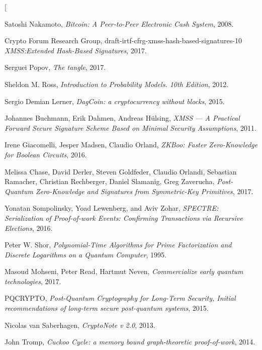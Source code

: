 \documentclass[a4paper,10pt,twocolumn]{article}
\begin{document}
  \twocolumn[
	\begin{@twocolumnfalse}

  \begin{thebibliography}{99}
	
		Satoshi Nakamoto,
		\emph{Bitcoin: A Peer-to-Peer Electronic Cash System}, 2008.
	
	Crypto Forum Research Group, draft-irtf-cfrg-xmss-hash-based-signatures-10
		\emph{XMSS:Extended Hash-Based Signatures}, 2017.
		
	Serguei Popov,
		\emph{The tangle}, 2017.
	
	Sheldon M. Ross,
		\emph{Introduction to Probability Models. 10th Edition}, 2012.
	
	Sergio Demian Lerner,
		\emph{DagCoin: a cryptocurrency without blocks}, 2015.
	
	Johannes Buchmann, Erik Dahmen, Andreas H\"ulsing,
		\emph{XMSS --- A Practical Forward Secure Signature Scheme Based on Minimal Security Assumptions}, 2011.
	
	Irene Giacomelli, Jesper Madsen, Claudio Orland,
		\emph{ZKBoo: Faster Zero-Knowledge for Boolean Circuits}, 2016.
		
	Melissa Chase, David Derler, Steven Goldfeder, Claudio Orlandi, Sebastian Ramacher, Christian Rechberger, Daniel Slamanig, Greg Zaverucha,
		\emph{Post-Quantum Zero-Knowledge and Signatures from Symmetric-Key Primitives}, 2017.
		
	Yonatan Sompolinsky, Yoad Lewenberg, and Aviv Zohar, 
		\emph{SPECTRE\@:	Serialization of Proof-of-work Events: Confirming Transactions via Recursive Elections}, 2016.
	
	Peter W. Shor, 
		\emph{Polynomial-Time Algorithms for Prime Factorization and Discrete Logarithms on a Quantum Computer}, 1995.
		
	Masoud Mohseni, Peter Read, Hartmut Neven,
		\emph{Commercialize early quantum technologies}, 2017.
		
	PQCRYPTO,
		\emph{Post-Quantum Cryptography for Long-Term Security, Initial recommendations of long-term secure post-quantum
		systems}, 2015.
			
	Nicolas van Saberhagen,
		\emph{CryptoNote v 2.0}, 2013.

	John Tromp,
		\emph{Cuckoo Cycle: a memory bound graph-theoretic proof-of-work}, 2014.


\end{thebibliography}
\end{@twocolumnfalse}
\end{document}
